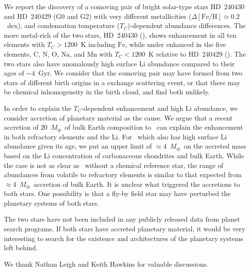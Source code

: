\documentclass[modern, letterpaper]{aastex61}
\newcommand*\elem[1]{\ensuremath{\mathrm{#1}}}
\newcommand*\elemH[1]{\ensuremath{[\mathrm{#1}/\elem{H}]}}
\newcommand*{\feh}{\ensuremath{\elemH{Fe}}}
\newcommand{\sunanalog}{\text{Krios}}
\newcommand{\bizarreone}{\text{Kronos}}
\newcommand{\Tcondens}{\ensuremath{T_C}}
\newcommand{\mearth}{\ensuremath{M_\oplus}}
\begin{document}
We report the discovery of a comoving pair of bright
solar-type stars HD~240430 and HD~240429 (G0 and G2) with very different
metallicities ($\Delta\feh \approx 0.2$~dex), and condensation temperature
(\Tcondens)-dependent abundance differences.
The more metal-rich of the two stars, HD~240430 (\bizarreone), shows enhancement in
all ten elements with $\Tcondens > 1200$~K including \elem{Fe}, while under
enhanced in the five elements, \elem{C}, \elem{N}, \elem{O}, \elem{Na}, and
\elem{Mn} with $\Tcondens < 1200$~K relative to HD~240429 (\sunanalog).
The two stars also have anomalously high surface \elem{Li} abundance compared
to their ages of $\sim 4$~Gyr.
We consider that the comoving pair may have formed from two stars of different
birth origins in a exchange scattering event, or that there may be chemical
inhomogeneity in the birth cloud, and find both unlikely.

In order to explain the $\Tcondens$-dependent enhancement and high \elem{Li}
abundance, we consider accretion of planetary material as the cause.
We argue that a recent accretion of $20$~\mearth\ of bulk Earth
composition to \bizarreone\ can explain the enhancement in both refractory
elements and the \elem{Li}.
For \sunanalog\ which also has high surface \elem{Li} abundance given its age,
we put an upper limit of $\approx 4$~\mearth\ on the accreted mass
based on the \elem{Li} concentration of carbonaceous chondrites and bulk Earth.
While the case is not as clear as \bizarreone\ without a chemical reference star,
the range of abundances from volatile to refractory elements is
similar to that expected from $\approx 4$~\mearth\ accretion of bulk Earth.
It is unclear what triggered the accretions to both stars.
One possibility is that a fly-by field star may have
perturbed the planetary systems of both stars.

The two stars have not been included in any publicly released data from planet
search programs.
If both stars have accreted planetary material, it would be very interesting to
search for the existence and architectures of the planetary systems left
behind.


\acknowledgements

We thank Nathan Leigh and Keith Hawkins for valuable discussions.
\end{document}
